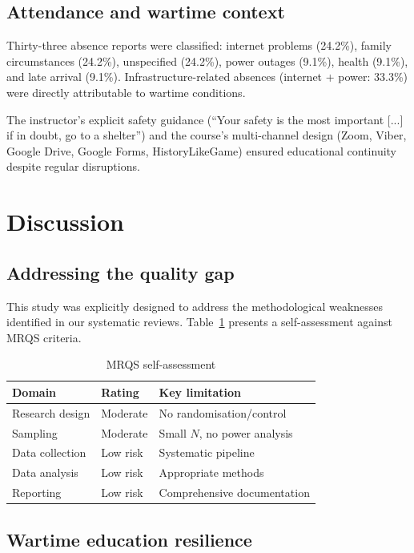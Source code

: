 \documentclass[review]{elsarticle}
\begin{document}
\subsection{Attendance and wartime context}

Thirty-three absence reports were classified: internet problems (24.2\%), family circumstances (24.2\%), unspecified (24.2\%), power outages (9.1\%), health (9.1\%), and late arrival (9.1\%). Infrastructure-related absences (internet + power: 33.3\%) were directly attributable to wartime conditions.

The instructor's explicit safety guidance (``Your safety is the most important [...] if in doubt, go to a shelter'') and the course's multi-channel design (Zoom, Viber, Google Drive, Google Forms, HistoryLikeGame) ensured educational continuity despite regular disruptions.


\section{Discussion}

\subsection{Addressing the quality gap}

This study was explicitly designed to address the methodological weaknesses identified in our systematic reviews. Table~\ref{tab:mrqs} presents a self-assessment against MRQS criteria.

\begin{table}[!h]
\centering
\caption{MRQS self-assessment}
\label{tab:mrqs}
\begin{tabular}{@{}lll@{}}
\toprule
\textbf{Domain} & \textbf{Rating} & \textbf{Key limitation} \\
\midrule
Research design & Moderate & No randomisation/control \\
Sampling & Moderate & Small $N$, no power analysis \\
Data collection & Low risk & Systematic pipeline \\
Data analysis & Low risk & Appropriate methods \\
Reporting & Low risk & Comprehensive documentation \\
\bottomrule
\end{tabular}
\end{table}

\subsection{Wartime education resilience}
\end{document}
